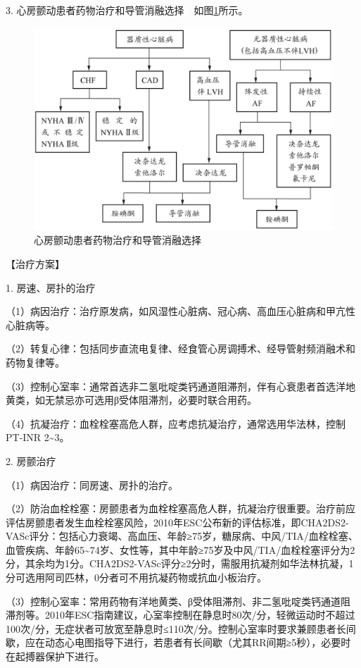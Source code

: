 3. 心房颤动患者药物治疗和导管消融选择　如图\ref{fig2-2-11}所示。

\begin{figure}[!htbp]
 \centering
 \includegraphics{./images/Image00056.jpg}
 \captionsetup{justification=centering}
 \caption{心房颤动患者药物治疗和导管消融选择}
 \label{fig2-2-11}
  \end{figure} 

【治疗方案】

1. 房速、房扑的治疗

（1）病因治疗：治疗原发病，如风湿性心脏病、冠心病、高血压心脏病和甲亢性心脏病等。

（2）转复心律：包括同步直流电复律、经食管心房调搏术、经导管射频消融术和药物复律等。

（3）控制心室率：通常首选非二氢吡啶类钙通道阻滞剂，伴有心衰患者首选洋地黄类，如无禁忌亦可选用β受体阻滞剂，必要时联合用药。

（4）抗凝治疗：血栓栓塞高危人群，应考虑抗凝治疗，通常选用华法林，控制PT-INR
2\textasciitilde{}3。

2. 房颤治疗

（1）病因治疗：同房速、房扑的治疗。

（2）防治血栓栓塞：房颤患者为血栓栓塞高危人群，抗凝治疗很重要。治疗前应评估房颤患者发生血栓栓塞风险，2010年ESC公布新的评估标准，即CHA2DS2-VASc评分：包括心力衰竭、高血压、年龄≥75岁，糖尿病、中风/TIA/血栓栓塞、血管疾病、年龄65\textasciitilde{}74岁、女性等，其中年龄≥75岁及中风/TIA/血栓栓塞评分为2分，其余均为1分。CHA2DS2-VASc评分≥2分时，需服用抗凝剂如华法林抗凝，1分可选用阿司匹林，0分者可不用抗凝药物或抗血小板治疗。

（3）控制心室率：常用药物有洋地黄类、β受体阻滞剂、非二氢吡啶类钙通道阻滞剂等。2010年ESC指南建议，心室率控制在静息时80次/分，轻微运动时不超过100次/分，无症状者可放宽至静息时≤110次/分。控制心室率时要求兼顾患者长间歇，应在动态心电图指导下进行，若患者有长间歇（尤其RR间期≥5秒），必要时在起搏器保护下进行。

